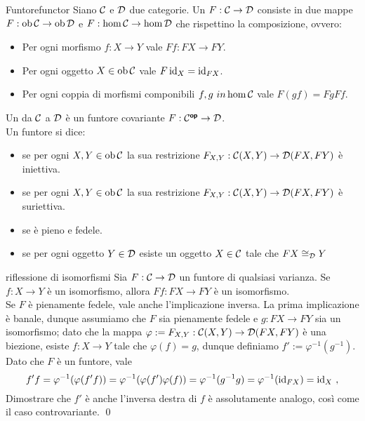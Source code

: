 \documentclass{article}
\renewcommand\C{\mc{C}}
\newcommand\D{\mc{D}}
\begin{document}
\begin{definition}{Funtore}{functor}
    Siano $\C$ e $\D$ due categorie. Un  $F: \C\to\D$ consiste in due mappe $F:\ob\C\to\ob\D$ e $F:\hom\C\to\hom\D$ che rispettino la composizione, ovvero:\begin{itemize}
        \item Per ogni morfismo $f :X\to Y$ vale $Ff: FX \to FY$.
        \item Per ogni oggetto $X \in \ob\C$ vale $F\operatorname{id}_X = \operatorname{id}_{FX}$.
        \item Per ogni coppia di morfismi componibili $f,g\ in \hom\C$ vale $F(gf) = FgFf$.
    \end{itemize}
    Un  da $\C$ a $\D$ è un funtore covariante $F: \C^\op\to\D$.\\
    Un funtore si dice:\begin{itemize}
        \item {} se per ogni $X,Y \in \ob\C$ la sua restrizione $F_{X,Y}:\C(X,Y)\to \D(FX,FY)$ è iniettiva.
        \item {} se per ogni $X,Y \in \ob\C$ la sua restrizione $F_{X,Y}:\C(X,Y)\to \D(FX,FY)$ è suriettiva.
        \item {} se è pieno e fedele.
        \item {} se per ogni oggetto $Y \in \D$ esiste un oggetto $X \in \C$ tale che $FX\cong_\D Y$
    \end{itemize}
\end{definition}
\begin{proposition}{}{riflessione di isomorfismi}
    Sia $F:\C\to\D$ un funtore di qualsiasi varianza. Se $f:X\to Y$ è un isomorfismo, allora $Ff:FX\to FY$ è un isomorfismo.\\
    Se $F$ è pienamente fedele, vale anche l'implicazione inversa.
    \proof 
    La prima implicazione è banale, dunque assumiamo che $F$ sia pienamente fedele e $g:FX\to FY$ sia un isomorfismo; dato che la mappa $\varphi := F_{X,Y} : \C(X,Y) \to \D(FX,FY)$ è una biezione, esiste $f: X\to Y$ tale che $\varphi(f) = g$, dunque definiamo $f' := \varphi^{-1}(g^{-1})$. Dato che $F$ è un funtore, vale
    \[f'f = \varphi^{-1}(\varphi(f'f) )=\varphi^{-1}(\varphi(f')\varphi(f)) = \varphi^{-1}(g^{-1}g) = \varphi^{-1}(\operatorname{id}_{FX}) = \operatorname{id}_X\ ,\]
    Dimostrare che $f'$ è anche l'inversa destra di $f$ è assolutamente analogo, così come il caso controvariante.
    \qed
\end{proposition}
\end{document}
